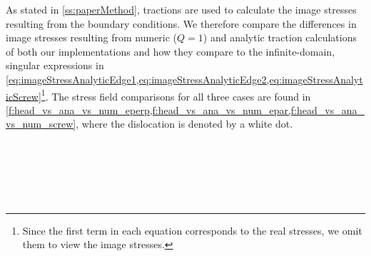 As stated in \cref{ss:paperMethod}, tractions are used to calculate the image stresses resulting from the boundary conditions. We therefore compare the differences in image stresses resulting from numeric ($Q = 1$) and analytic traction calculations of both our implementations and how they compare to the infinite-domain, singular expressions in \cref{eq:imageStressAnalyticEdge1,eq:imageStressAnalyticEdge2,eq:imageStressAnalyticScrew}\footnote{Since the first term in each equation corresponds to the real stresses, we omit them to view the image stresses.}. The stress field comparisons for all three cases are found in \cref{f:head_vs_ana_vs_num_eperp,f:head_vs_ana_vs_num_epar,f:head_vs_ana_vs_num_screw}, where the dislocation is denoted by a white dot.

\begin{figure}[t]
  \centering
  ~
  ~
  ~

  \hspace*{0.3cm}~
  ~
  ~

  \hspace*{0.3cm}~
  ~
  ~


\end{figure}
